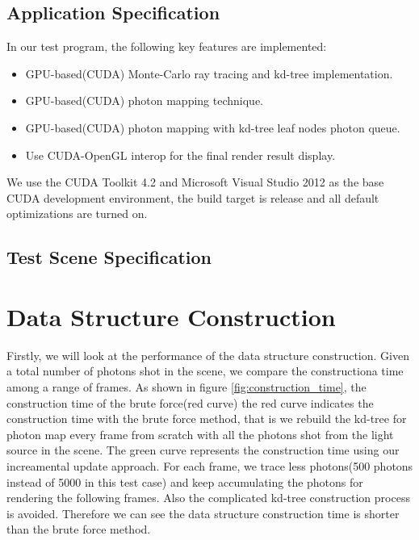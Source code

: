 \subsection{Application Specification}

In our test program, the following key features are implemented: 

\begin{itemize}

\item{GPU-based(CUDA) Monte-Carlo ray tracing and kd-tree implementation.}

\item{GPU-based(CUDA) photon mapping technique. } 

\item{GPU-based(CUDA) photon mapping with kd-tree leaf nodes photon queue.} 

\item{Use CUDA-OpenGL interop for the final render result display. }

\end{itemize}

We use the CUDA Toolkit 4.2 and Microsoft Visual Studio 2012 as the base CUDA development environment, the build target is release and all default optimizations are turned on. 

\subsection{Test Scene Specification}


\section{Data Structure Construction}
\label{sec:build_time}

Firstly, we will look at the performance of the data structure construction. Given a total number of photons shot in the scene, we compare the constructiona time among a range of frames. As shown in figure \ref{fig:construction_time}, the construction time of the brute force(red curve)  the red curve indicates the construction time with the brute force method, that is we rebuild the kd-tree for photon map every frame from scratch with all the photons shot from the light source in the scene. The green curve represents the construction time using our increamental update approach. For each frame, we trace less photons(500 photons instead of 5000 in this test case) and keep accumulating the photons for rendering the following frames. Also the complicated kd-tree construction process is avoided. Therefore we can see the data structure construction time is shorter than the brute force method. 


